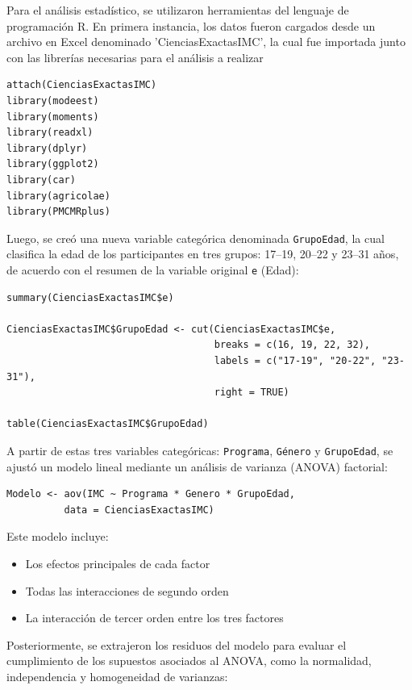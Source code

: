 \documentclass{rapport}
\begin{document}
\vspace{0.5cm}

Para el análisis estadístico, se utilizaron herramientas del lenguaje de programación R. En primera instancia, los datos fueron cargados desde un archivo en Excel denominado 'CienciasExactasIMC', la cual fue importada junto con las librerías necesarias para el análisis a realizar

\begin{lstlisting}[style=rstyle]
attach(CienciasExactasIMC)
library(modeest)
library(moments)
library(readxl)
library(dplyr)
library(ggplot2)
library(car)
library(agricolae)
library(PMCMRplus)
\end{lstlisting}

 Luego, se creó una nueva variable categórica denominada \texttt{GrupoEdad}, la cual clasifica la edad de los participantes en tres grupos: 17--19, 20--22 y 23--31 años, de acuerdo con el resumen de la variable original \texttt{e} (Edad):

\begin{lstlisting}[style=rstyle]
summary(CienciasExactasIMC$e)

CienciasExactasIMC$GrupoEdad <- cut(CienciasExactasIMC$e,
                                    breaks = c(16, 19, 22, 32),
                                    labels = c("17-19", "20-22", "23-31"),
                                    right = TRUE)

table(CienciasExactasIMC$GrupoEdad)
\end{lstlisting}

A partir de estas tres variables categóricas: \texttt{Programa}, \texttt{Género} y \texttt{GrupoEdad}, se ajustó un modelo lineal mediante un análisis de varianza (ANOVA) factorial:

\begin{lstlisting}[style=rstyle]
Modelo <- aov(IMC ~ Programa * Genero * GrupoEdad, 
          data = CienciasExactasIMC)
\end{lstlisting}

Este modelo incluye:

\begin{itemize}
    \item Los efectos principales de cada factor
    \item Todas las interacciones de segundo orden
    \item La interacción de tercer orden entre los tres factores
\end{itemize}

Posteriormente, se extrajeron los residuos del modelo para evaluar el cumplimiento de los supuestos asociados al ANOVA, como la normalidad, independencia y homogeneidad de varianzas:
\end{document}
